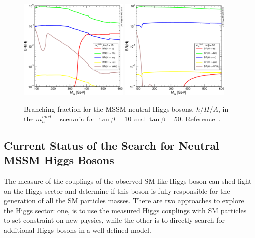 \begin{figure}[tp]
\begin{center}
            \includegraphics[width=0.47\textwidth]{figure/BR_higgs/YRHXS3_BR_fig37.pdf}
            \includegraphics[width=0.47\textwidth]{figure/BR_higgs/YRHXS3_BR_fig38.pdf}

    \end{center}
    \caption{Branching fraction for the MSSM neutral Higgs bosons, $h/H/A$, in the $m_h^{mod+}$ scenario for $\tan\beta=10$ and
	$\tan\beta=50$. Reference~\cite{LHCxsec}.}
   \label{fig:br}

\end{figure}



\subsection{Current Status of the Search for Neutral MSSM Higgs Bosons}

The measure of the couplings of the observed SM-like Higgs boson can shed light on the Higgs sector and determine if this boson
is fully responsible for the generation of all the SM particles masses. 
There are two approaches to explore the Higgs sector: one, is to use the measured Higgs couplings with SM particles to 
set constraint on new physics, while the other is to directly search for additional Higgs bosons in a well defined model.

